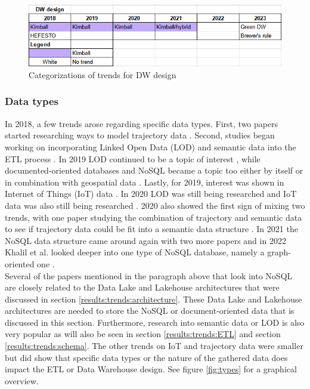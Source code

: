 \documentclass[11pt]{article}
\begin{document}
\begin{figure}
\centering
\includegraphics[scale=0.75]{Images/Design.png}
\caption{Categorizations of trends for DW design}
\label{fig:design}
\end{figure}

\subsubsection{Data types}
\label{results:trends:types}
In 2018, a few trends arose regarding specific data types. First, two papers started researching ways to model trajectory data \cite{Azaiez2018353, Zekri2018380}. Second, studies began working on incorporating Linked Open Data (LOD) and semantic data into the ETL process \cite{Khouri2018, Khouri20181, Berkani20181}. In 2019 LOD continued to be a topic of interest \cite{khouri2019data}, while documented-oriented databases and NoSQL became a topic too either by itself \cite{Artamonov2019794, Bouaziz2019221} or in combination with geospatial data \cite{Ferro2019221}. Lastly, for 2019, interest was shown in Internet of Things (IoT) data \cite{Rahman2019181}. In 2020 LOD was still being researched \cite{Berkani2020397} and IoT data was also still being researched \cite{Plazas202084}. 2020 also showed the first sign of mixing two trends, with one paper studying the combination of trajectory and semantic data to see if trajectory data could be fit into a semantic data structure \cite{RodriguezBrisaboa2020113}. In 2021 the NoSQL data structure came around again with two more papers \cite{Bouaziz2021129, Banerjee2021162} and in 2022 Khalil et al. looked deeper into one type of NoSQL database, namely a graph-oriented one \cite{Khalil2022547}. \\

Several of the papers mentioned in the paragraph above that look into NoSQL \cite{Liu202334, Artamonov2019794, Bouaziz2019221, Bouaziz2021129, Banerjee2021162, Khalil2022547} are closely related to the Data Lake and Lakehouse architectures that were discussed in section \ref{results:trends:architecture}. These Data Lake and Lakehouse architectures are needed to store the NoSQL or document-oriented data that is discussed in this section. Furthermore, research into semantic data or LOD is also very popular as will also be seen in section \ref{results:trends:ETL} and section \ref{results:trends:schema}. The other trends on IoT and trajectory data were smaller but did show that specific data types or the nature of the gathered data does impact the ETL or Data Warehouse design. See figure \ref{fig:types} for a graphical overview. \\
\end{document}
